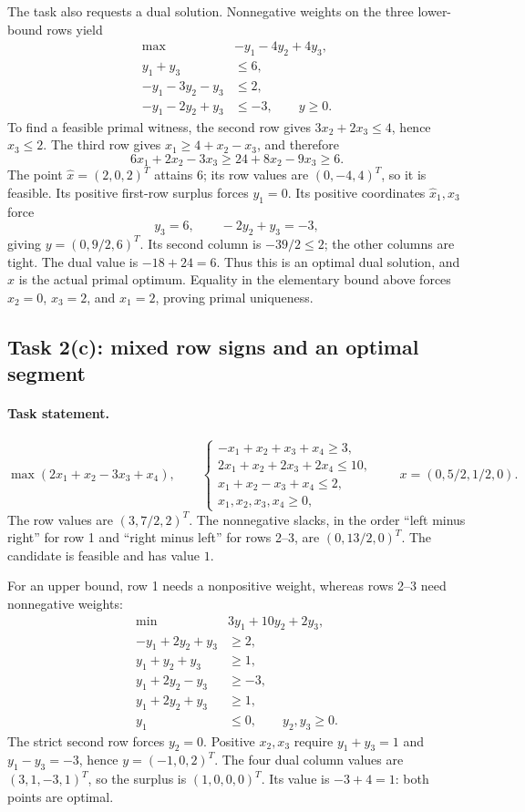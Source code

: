 \documentclass[11pt,a4paper]{article}
\begin{document}
The task also requests a dual solution. Nonnegative weights on the three
lower-bound rows yield
\[
  \begin{aligned}
    \max\quad&-y_1-4y_2+4y_3,\\
    y_1+y_3&\leq6,\\
    -y_1-3y_2-y_3&\leq2,\\
    -y_1-2y_2+y_3&\leq-3,\qquad y\geq0.
  \end{aligned}
\]
To find a feasible primal witness, the second row gives
$3x_2+2x_3\leq4$, hence $x_3\leq2$. The third row gives
$x_1\geq4+x_2-x_3$, and therefore
\[
  6x_1+2x_2-3x_3\geq24+8x_2-9x_3\geq6.
\]
The point $\hat x=(2,0,2)^T$ attains $6$; its row values are $(0,-4,4)^T$,
so it is feasible. Its positive first-row surplus forces $y_1=0$.
Its positive coordinates $\hat x_1,\hat x_3$ force
\[
  y_3=6,\qquad -2y_2+y_3=-3,
\]
giving $y=(0,9/2,6)^T$. Its second column is $-39/2\leq2$;
the other columns are tight. The dual value is $-18+24=6$.
Thus this is an optimal dual solution, and $\hat x$ is the actual primal
optimum. Equality in the elementary bound above forces $x_2=0$, $x_3=2$,
and $x_1=2$, proving primal uniqueness.

\subsection{Task 2(c): mixed row signs and an optimal segment}
\paragraph{Task statement.}
\[
  \max(2x_1+x_2-3x_3+x_4),\qquad
  \begin{cases}
    -x_1+x_2+x_3+x_4\geq3,    \\
    2x_1+x_2+2x_3+2x_4\leq10, \\
    x_1+x_2-x_3+x_4\leq2,     \\
    x_1,x_2,x_3,x_4\geq0,
  \end{cases}
  \qquad x=(0,5/2,1/2,0).
\]
The row values are $(3,7/2,2)^T$. The nonnegative slacks, in the
order ``left minus right'' for row 1 and ``right minus left'' for rows 2--3,
are $(0,13/2,0)^T$. The candidate is feasible and has value $1$.

For an upper bound, row 1 needs a nonpositive weight, whereas rows 2--3
need nonnegative weights:
\[
  \begin{aligned}
    \min\quad&3y_1+10y_2+2y_3,\\
    -y_1+2y_2+y_3&\geq2,\\
    y_1+y_2+y_3&\geq1,\\
    y_1+2y_2-y_3&\geq-3,\\
    y_1+2y_2+y_3&\geq1,\\
    y_1&\leq0,\qquad y_2,y_3\geq0.
  \end{aligned}
\]
The strict second row forces $y_2=0$. Positive $x_2,x_3$ require
$y_1+y_3=1$ and $y_1-y_3=-3$, hence $y=(-1,0,2)^T$.
The four dual column values are $(3,1,-3,1)^T$, so the surplus is
$(1,0,0,0)^T$. Its value is $-3+4=1$: both points are optimal.
\end{document}
